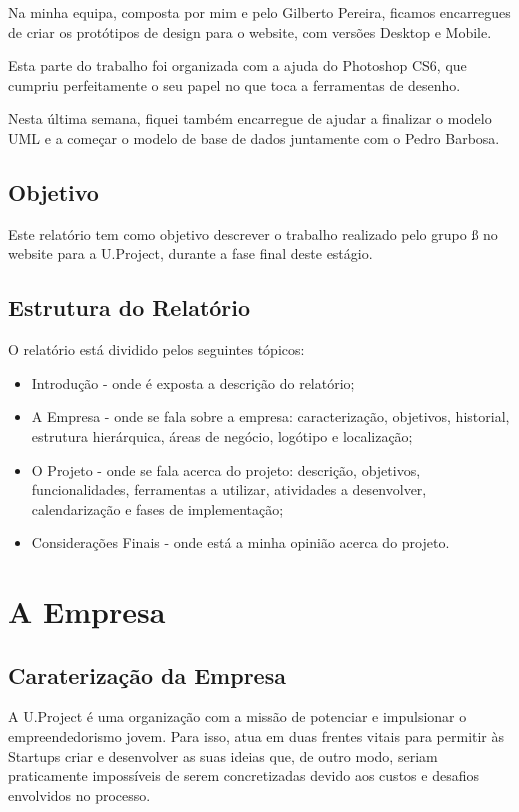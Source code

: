 \documentclass[11pt]{report}
\begin{document}
Na minha equipa, composta por mim e pelo Gilberto Pereira, ficamos encarregues de criar os protótipos de design para o website, com versões Desktop e Mobile.

Esta parte do trabalho foi organizada com a ajuda do Photoshop CS6, que cumpriu perfeitamente o seu papel no que toca a ferramentas de desenho.

Nesta última semana, fiquei também encarregue de ajudar a finalizar o modelo UML e a começar o modelo de base de dados juntamente com o Pedro Barbosa.



\section{Objetivo}
Este relatório tem como objetivo descrever o trabalho realizado pelo grupo ß no website para a U.Project, durante a fase final deste estágio.

\section{Estrutura do Relatório}
O relatório está dividido pelos seguintes tópicos:
\begin{itemize}
    \item Introdução - onde é exposta a descrição do relatório;
    \item A Empresa - onde se fala sobre a empresa: caracterização, objetivos, historial, estrutura hierárquica, áreas de negócio, logótipo e localização;
    \item O Projeto - onde se fala acerca do projeto: descrição, objetivos, funcionalidades, ferramentas a utilizar, atividades a desenvolver, calendarização e fases de implementação;
    \item Considerações Finais - onde está a minha opinião acerca do projeto.
\end{itemize}
\chapter{A Empresa}

\section{Caraterização da Empresa}
A U.Project é uma organização com a missão de potenciar e impulsionar o empreendedorismo jovem. Para isso, atua em duas frentes vitais para permitir às Startups criar e desenvolver as suas ideias que, de outro modo, seriam praticamente impossíveis de serem concretizadas devido aos custos e desafios envolvidos no processo.
\end{document}
